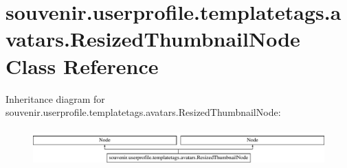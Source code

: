 \hypertarget{classsouvenir_1_1userprofile_1_1templatetags_1_1avatars_1_1ResizedThumbnailNode}{\section{souvenir.\-userprofile.\-templatetags.\-avatars.\-Resized\-Thumbnail\-Node Class Reference}
\label{classsouvenir_1_1userprofile_1_1templatetags_1_1avatars_1_1ResizedThumbnailNode}
}
Inheritance diagram for souvenir.\-userprofile.\-templatetags.\-avatars.\-Resized\-Thumbnail\-Node\-:\begin{figure}[H]
\begin{center}
\leavevmode
\includegraphics[height=1.443299cm]{classsouvenir_1_1userprofile_1_1templatetags_1_1avatars_1_1ResizedThumbnailNode}
\end{center}
\end{figure}
